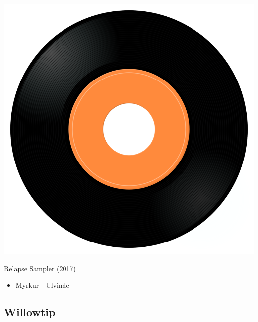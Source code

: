 \begin{minipage}[t]{0.25\textwidth}\vspace{0pt}
\captionsetup{type=figure}
\includegraphics[width=\textwidth]{Images/cover.png}
\caption*{Relapse Sampler (2017)}
\end{minipage}
\begin{minipage}[t]{0.25\textwidth}\vspace{0pt}
\begin{itemize}[nosep,leftmargin=1em,labelwidth=*,align=left]
	\setlength{\itemsep}{0pt}
	\item Myrkur - Ulvinde
\end{itemize}
\end{minipage}

\subsection{Willowtip}

